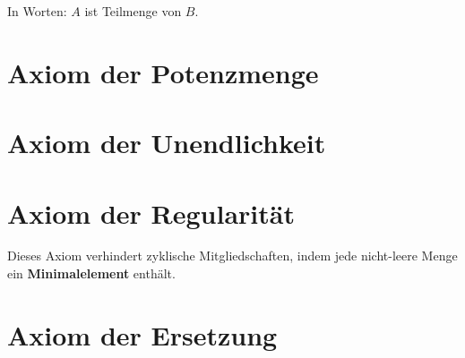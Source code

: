 \documentclass[main.tex]{subfiles}
\begin{document}
%
{%
%
}
\begin{remark}
    In Worten: \(A\) ist Teilmenge von \(B\).
\end{remark}

\section{Axiom der Potenzmenge}


%
{%
%
}

%
{%
%
}

%
{%
%
}
\begin{tabproof}
\end{tabproof}

\section{Axiom der Unendlichkeit}



\section{Axiom der Regularität}

\begin{remark}
Dieses Axiom verhindert zyklische Mitgliedschaften, indem jede nicht-leere Menge ein 
\textbf{Minimalelement} enthält.    
\end{remark}

\section{Axiom der Ersetzung}
\end{document}
